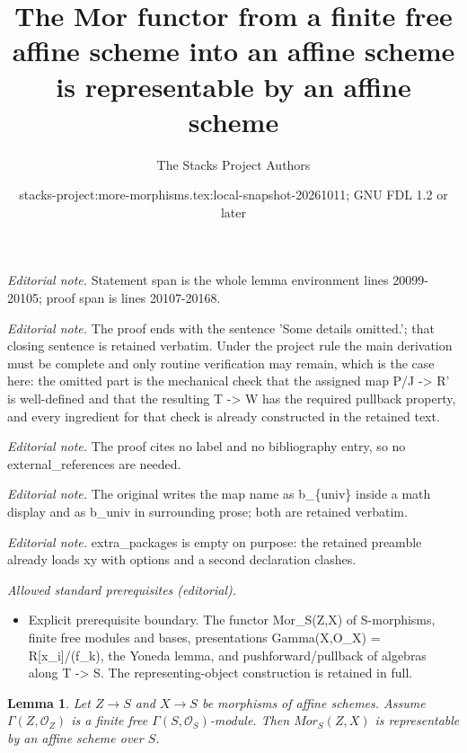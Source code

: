 \documentclass[10pt,a4paper]{amsart}
\title{The Mor functor from a finite free affine scheme into an affine scheme is representable by an affine scheme}
\author{The Stacks Project Authors}
\date{stacks-project:more-morphisms.tex:local-snapshot-20261011; GNU FDL 1.2 or later}
\theoremstyle{plain}
\newtheorem{lemma}[subsection]{Lemma}
\theoremstyle{definition}
\theoremstyle{remark}
\numberwithin{equation}{subsection}
\begin{document}
\maketitle
\noindent\textit{Editorial note.} Statement span is the whole lemma environment lines 20099-20105; proof span is lines 20107-20168.\par\medskip
\noindent\textit{Editorial note.} The proof ends with the sentence 'Some details omitted.'; that closing sentence is retained verbatim. Under the project rule the main derivation must be complete and only routine verification may remain, which is the case here: the omitted part is the mechanical check that the assigned map P/J -> R' is well-defined and that the resulting T -> W has the required pullback property, and every ingredient for that check is already constructed in the retained text.\par\medskip
\noindent\textit{Editorial note.} The proof cites no label and no bibliography entry, so no external\_references are needed.\par\medskip
\noindent\textit{Editorial note.} The original writes the map name as b\_\{univ\} inside a math display and as b\_univ in surrounding prose; both are retained verbatim.\par\medskip
\noindent\textit{Editorial note.} extra\_packages is empty on purpose: the retained preamble already loads xy with options and a second declaration clashes.\par\medskip
\noindent\textit{Allowed standard prerequisites (editorial).}\begin{itemize}
\item Explicit prerequisite boundary. The functor Mor\_S(Z,X) of S-morphisms, finite free modules and bases, presentations Gamma(X,O\_X) = R[x\_i]/(f\_k), the Yoneda lemma, and pushforward/pullback of algebras along T -> S. The representing-object construction is retained in full.
\end{itemize}\medskip
\begin{lemma}
\label{lemma-hom-from-finite-free-into-affine}
Let $Z \to S$ and $X \to S$ be morphisms of affine schemes.
Assume $\Gamma(Z, \mathcal{O}_Z)$ is a finite free
$\Gamma(S, \mathcal{O}_S)$-module. Then $\mathit{Mor}_S(Z, X)$
is representable by an affine scheme over $S$.
\end{lemma}
\end{document}
